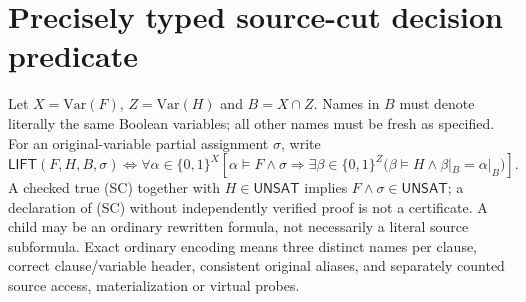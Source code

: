 \documentclass[11pt]{article}
\newcommand{\UNSAT}{\mathsf{UNSAT}}
\newcommand{\Lift}{\mathsf{LIFT}}
\begin{document}
\section{Precisely typed source-cut decision predicate}
Let $X=\mathrm{Var}(F)$, $Z=\mathrm{Var}(H)$ and $B=X\cap Z$. Names in $B$ must denote literally the same Boolean variables; all other names must be fresh as specified. For an original-variable partial assignment $\sigma$, write
\[
\Lift(F,H,B,\sigma)\Longleftrightarrow
\forall\alpha\in\{0,1\}^{X}
\left[\alpha\models F\land\sigma\Rightarrow
\exists\beta\in\{0,1\}^{Z}
\big(\beta\models H\land \beta|_B=\alpha|_B\big)\right].\tag{SC}
\]
A checked true (SC) together with $H\in\UNSAT$ implies $F\land\sigma\in\UNSAT$; a declaration of (SC) without independently verified proof is not a certificate. A child may be an ordinary rewritten formula, not necessarily a literal source subformula. Exact ordinary encoding means three distinct names per clause, correct clause/variable header, consistent original aliases, and separately counted source access, materialization or virtual probes.
\end{document}
